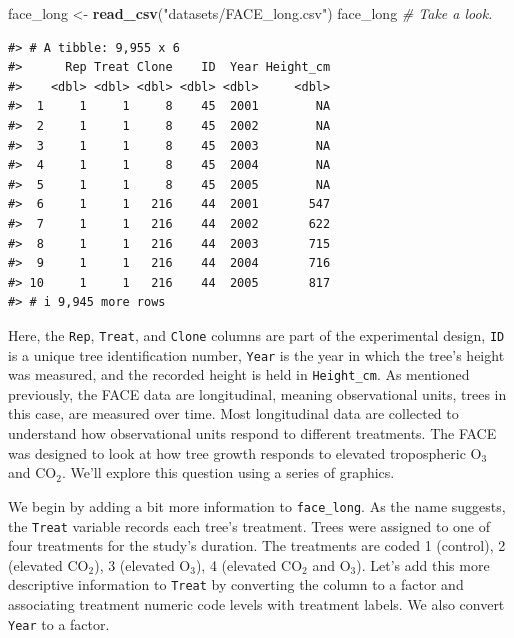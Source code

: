 \documentclass[
  11pt,
]{krantz}
\newenvironment{Shaded}{\begin{snugshade}}{\end{snugshade}}
\newcommand{\CommentTok}[1]{\textcolor[rgb]{0.56,0.35,0.01}{\textit{#1}}}
\newcommand{\KeywordTok}[1]{\textcolor[rgb]{0.13,0.29,0.53}{\textbf{#1}}}
\newcommand{\NormalTok}[1]{#1}
\newcommand{\StringTok}[1]{\textcolor[rgb]{0.31,0.60,0.02}{#1}}
\theoremstyle{definition}
\theoremstyle{definition}
\theoremstyle{definition}
\theoremstyle{definition}
\theoremstyle{remark}
\begin{document}
\begin{Shaded}
\begin{Highlighting}[]
\NormalTok{face\_long \textless{}{-}}\StringTok{ }\KeywordTok{read\_csv}\NormalTok{(}\StringTok{"datasets/FACE\_long.csv"}\NormalTok{)}
\NormalTok{face\_long }\CommentTok{\# Take a look.}
\end{Highlighting}
\end{Shaded}

\begin{verbatim}
#> # A tibble: 9,955 x 6
#>      Rep Treat Clone    ID  Year Height_cm
#>    <dbl> <dbl> <dbl> <dbl> <dbl>     <dbl>
#>  1     1     1     8    45  2001        NA
#>  2     1     1     8    45  2002        NA
#>  3     1     1     8    45  2003        NA
#>  4     1     1     8    45  2004        NA
#>  5     1     1     8    45  2005        NA
#>  6     1     1   216    44  2001       547
#>  7     1     1   216    44  2002       622
#>  8     1     1   216    44  2003       715
#>  9     1     1   216    44  2004       716
#> 10     1     1   216    44  2005       817
#> # i 9,945 more rows
\end{verbatim}

Here, the \texttt{Rep}, \texttt{Treat}, and \texttt{Clone} columns are part of the experimental design, \texttt{ID} is a unique tree identification number, \texttt{Year} is the year in which the tree's height was measured, and the recorded height is held in \texttt{Height\_cm}. As mentioned previously, the FACE data are longitudinal, meaning observational units, trees in this case, are measured over time. Most longitudinal data are collected to understand how observational units respond to different treatments. The FACE was designed to look at how tree growth responds to elevated tropospheric O\(_3\) and CO\(_2\). We'll explore this question using a series of graphics.

We begin by adding a bit more information to \texttt{face\_long}. As the name suggests, the \texttt{Treat} variable records each tree's treatment. Trees were assigned to one of four treatments for the study's duration. The treatments are coded 1 (control), 2 (elevated CO\(_2\)), 3 (elevated O\(_3\)), 4 (elevated CO\(_2\) and O\(_3\)). Let's add this more descriptive information to \texttt{Treat} by converting the column to a factor and associating treatment numeric code levels with treatment labels. We also convert \texttt{Year} to a factor.
\end{document}
